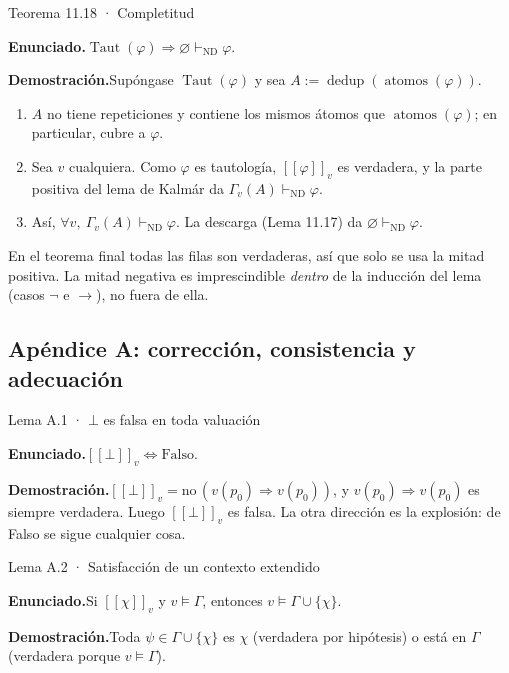 \documentclass[11pt,a4paper]{article}
\newcommand{\campo}[1]{\par\smallskip\noindent\textbf{#1}\enspace}
\newcommand{\enunciado}{\campo{Enunciado.}}
\newcommand{\prueba}{\campo{Demostración.}}
\newcommand{\Provnd}{\vdash_{\mathrm{ND}}}
\newcommand{\Imp}{\rightarrow}
\newcommand{\Not}{\neg}
\newcommand{\sem}[1]{[\![#1]\!]}
\newcommand{\Taut}{\operatorname{Taut}}
\newcommand{\atomos}{\operatorname{atomos}}
\newcommand{\dedup}{\operatorname{dedup}}
\begin{document}
\begin{resultado}{Teorema 11.18 · Completitud}
\enunciado \(\Taut(\varphi)\Rightarrow\varnothing\Provnd\varphi\).

\prueba Supóngase \(\Taut(\varphi)\) y sea \(A:=\dedup(\atomos(\varphi))\).
\begin{enumerate}
  \item \(A\) no tiene repeticiones y contiene los mismos átomos que
    \(\atomos(\varphi)\); en particular, cubre a \(\varphi\).
  \item Sea \(v\) cualquiera. Como \(\varphi\) es tautología,
    \(\sem\varphi_v\) es verdadera, y la parte positiva del lema de Kalmár da
    \(\Gamma_v(A)\Provnd\varphi\).
  \item Así, \(\forall v,\ \Gamma_v(A)\Provnd\varphi\). La descarga
    (Lema 11.17) da \(\varnothing\Provnd\varphi\).
\end{enumerate}
\end{resultado}

\begin{nota}
En el teorema final todas las filas son verdaderas, así que solo se usa la
mitad positiva. La mitad negativa es imprescindible \emph{dentro} de la
inducción del lema (casos \(\Not\) e \(\Imp\)), no fuera de ella.
\end{nota}

\subsection{Apéndice A: corrección, consistencia y adecuación}

\begin{resultado}{Lema A.1 · \(\bot\) es falsa en toda valuación}
\enunciado \(\sem{\bot}_v\iff\text{Falso}\).

\prueba \(\sem\bot_v=\text{no}\,(v(p_0)\Rightarrow v(p_0))\), y
\(v(p_0)\Rightarrow v(p_0)\) es siempre verdadera. Luego \(\sem\bot_v\) es
falsa. La otra dirección es la explosión: de Falso se sigue cualquier cosa.
\end{resultado}

\begin{resultado}{Lema A.2 · Satisfacción de un contexto extendido}
\enunciado Si \(\sem\chi_v\) y \(v\models\Gamma\), entonces
\(v\models\Gamma\cup\{\chi\}\).

\prueba Toda \(\psi\in\Gamma\cup\{\chi\}\) es \(\chi\) (verdadera por
hipótesis) o está en \(\Gamma\) (verdadera porque \(v\models\Gamma\)).
\end{resultado}
\end{document}
